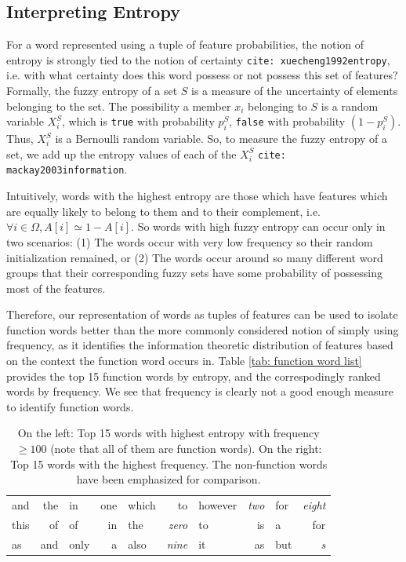 \documentclass[11pt]{book}
\newcommand{\citep}[1]{\texttt{cite: #1}}
\begin{document}
\subsection{Interpreting Entropy} \label{ssec: entropy math} For a word
represented using a tuple of feature probabilities, the notion of entropy is
strongly tied to the notion of certainty \citep{xuecheng1992entropy}, i.e. with
what certainty does this word possess or not possess this set of features?
Formally, the fuzzy entropy of a set $S$ is a measure of the uncertainty of
elements belonging to the set. The possibility a member $x_i$ belonging to $S$
is a random variable $X^S_i$, which is \texttt{true} with probability $p^S_i$,
\texttt{false} with probability $(1 - p^S_i)$. Thus, $X^S_i$ is a Bernoulli
random variable. So, to measure the fuzzy entropy of a set, we add up the
entropy values of each of the $X^S_i$ \citep{mackay2003information}. 

Intuitively, words with the highest entropy are those which have features which
are equally likely to belong to them and to their complement, i.e. $\forall i
\in \Omega, A[i] \simeq 1 - A[i]$. So words with high fuzzy entropy can occur
only in two scenarios: (1) The words occur with very low frequency so their
random initialization remained, or (2) The words occur around so many different
word groups that their corresponding fuzzy sets have some probability of
possessing most of the features.

Therefore, our representation of words as tuples of features can be used to
isolate function words better than the more commonly considered notion of
simply using frequency, as it identifies the information theoretic distribution
of features based on the context the function word occurs in. Table \ref{tab:
function word list} provides the top 15 function words by entropy, and the
correspodingly ranked words by frequency. We see that frequency is clearly not
a good enough measure to identify function words. 

{\tiny
\begin{table}[t]
    \centering
    {\small
    \begin{tabular}{l r | l r | l r | l r | l r}
    and		& the   &   in		&   one         &   which	    &   to          &   however	&   \emph{two}  &   for	    &   \emph{eight}  \\
    this    & of    &   of	    &   in          &   the		    &   \emph{zero} &   to		&   is          &   a	    &   for \\
    as	    & and   &   only	&   a           &   also	    &   \emph{nine} &   it		&   as          &   but	    &   \emph{s} 
    \end{tabular}
    }
    \caption{On the left: Top 15 words with highest entropy with frequency $\geq 100$ (note that all of them are function words). On the right: Top 15 words with the highest frequency. The non-function words have been emphasized for comparison.}
    \label{tab: function word list}
\end{table}
}   
\end{document}
